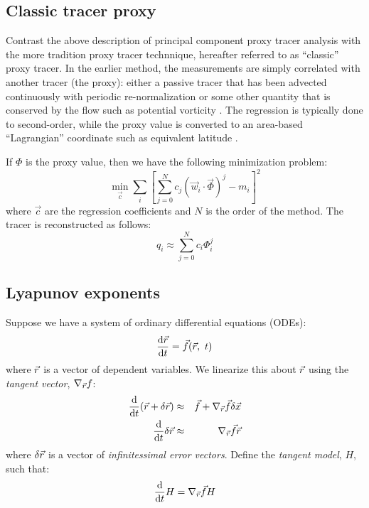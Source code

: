 \documentclass{article}
\begin{document}
\subsection{Classic tracer proxy}

\label{classic}

Contrast the above description of principal component proxy tracer
analysis with the more tradition proxy tracer technnique, hereafter
referred to as ``classic'' proxy tracer.
In the earlier method, the measurements are simply correlated with another
tracer (the proxy): either a passive tracer that has been advected
continuously with periodic re-normalization \citep{Allen_Nakamura2003} 
or some other quantity that is conserved by the flow 
such as potential vorticity \citep{Randall_etal2002,Hoskins_etal1985}.
The regression is typically done to second-order, while the proxy value
is converted to an area-based ``Lagrangian'' coordinate such as
equivalent latitude \citep{Butchart_Remsberg1986}.

If $\Phi$ is the proxy value, then we have the following minimization
problem:
\begin{equation}
	\min_{\vec c} \sum_i \left [ \sum_{j=0}^N c_j (\vec w_i \cdot \vec \Phi)^j - m_i \right ]^2
\end{equation}
where $\vec c$ are the regression coefficients and $N$ is the order of the
method. The tracer is reconstructed as follows:
\begin{equation}
	q_i \approx \sum_{j=0}^N c_i \Phi_i^j
\end{equation}

\subsection{Lyapunov exponents}

Suppose we have a system of ordinary differential equations (ODEs):
\begin{equation}
	\frac{\mathrm d \vec r}{\mathrm d t} = \vec f(\vec r, ~ t)
	\label{ODE}
\end{equation}
where $\vec r$ is a vector of dependent variables.
We linearize this about $\vec r$ using the {\it tangent vector},
$\nabla_{\vec r} f$:
\begin{eqnarray}
\frac{\mathrm d}{\mathrm d t} (\vec r + \delta \vec r) & \approx & \vec f + 
	\nabla_{\vec r} \vec f \delta \vec x \\
	\frac{\mathrm d}{\mathrm d t} \delta \vec r & \approx & \nabla_{\vec r} \vec f \vec r
\end{eqnarray}
where $\delta \vec r$ is a vector of {\it infinitessimal error vectors}.
Define the {\it tangent model}, $H$, such that:
\begin{equation} 
	\frac{\mathrm d}{\mathrm d t} H = \nabla_{\vec r} \vec f H \\
\end{equation}
\end{document}
